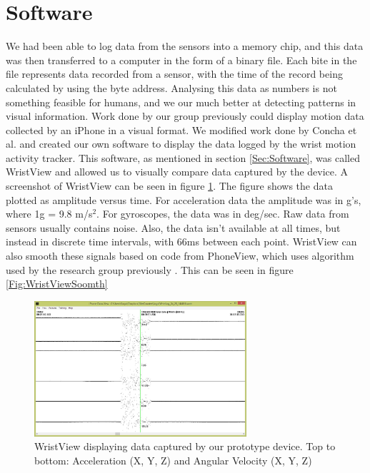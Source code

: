 \section{Software}
\label{Sec:ResultsSoftware}
We had been able to log data from the sensors into a memory chip,
and this data was then transferred to a computer in the form of a binary file.
Each bite in the file represents data recorded from a sensor,
with the time of the record being calculated by using the byte address.
Analysing this data as numbers is not something feasible for humans,
and we our much better at detecting patterns in visual information.
Work done by our group previously could display motion data collected by an iPhone in a visual format.
We modified work done by Concha et al. \cite{concha2014study} and created our own software to display the data logged by the wrist motion activity tracker.
This software, as mentioned in section \ref{Sec:Software},
was called WristView and allowed us to visually compare data captured by the device.
A screenshot of WristView can be seen in figure \ref{Fig:WristView}.
The figure shows the data plotted as amplitude versus time.
For acceleration data the amplitude was in g's, where 1g = 9.8 m/s$^2$. For gyroscopes, the data was in deg/sec.
Raw data from sensors usually contains noise.
Also, the data isn't available at all times,
but instead in discrete time intervals, with 66ms between each point.
WristView can also smooth these signals based on code from PhoneView, which uses algorithm used by the research group previously \cite{concha2014study}. This can be seen in figure \ref{Fig:WristViewSoomth}
\begin{figure}
\begin{center}
\includegraphics[width=0.7\textwidth]{images/WristView.jpg}
\caption{WristView displaying data captured by our prototype device. Top to bottom: Acceleration (X, Y, Z) and Angular Velocity (X, Y, Z)}
\label{Fig:WristView}
\end{center}
\end{figure}

